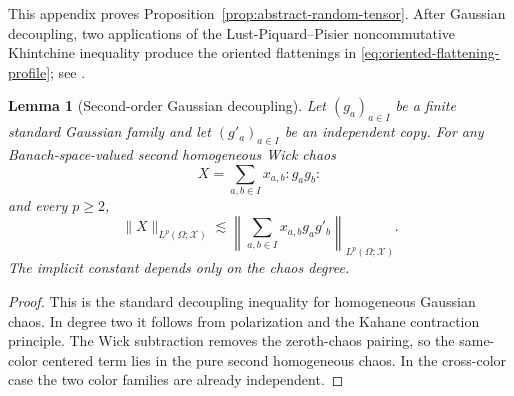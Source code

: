 \documentclass[10pt]{amsart}
\numberwithin{equation}{section}
\theoremstyle{plain}
\newtheorem{lemma}[theorem]{Lemma}
\theoremstyle{definition}
\theoremstyle{remark}
\begin{document}
This appendix proves Proposition~\ref{prop:abstract-random-tensor}.  After Gaussian decoupling, two applications of the Lust-Piquard--Pisier noncommutative Khintchine inequality produce the oriented flattenings in \eqref{eq:oriented-flattening-profile}; see \cite{DeLaPenaGine,LustPisier,DNY,Kaneshiro}.

\begin{lemma}[Second-order Gaussian decoupling]\label{lem:second-order-decoupling}
Let $(g_a)_{a\in I}$ be a finite standard Gaussian family and let $(g'_a)_{a\in I}$ be an independent copy.  For any Banach-space-valued second homogeneous Wick chaos
\[
        X=\sum_{a,b\in I}x_{a,b}:g_ag_b:
\]
and every $p\ge2$,
\begin{equation}\label{eq:second-order-decoupling}
        \|X\|_{L^p(\Omega;\mathcal X)}
        \lesssim
        \left\|\sum_{a,b\in I}x_{a,b}g_ag'_b\right\|_{L^p(\Omega;\mathcal X)}.
\end{equation}
The implicit constant depends only on the chaos degree.
\end{lemma}

\begin{proof}
This is the standard decoupling inequality for homogeneous Gaussian chaos.  In degree two it follows from polarization and the Kahane contraction principle.  The Wick subtraction removes the zeroth-chaos pairing, so the same-color centered term lies in the pure second homogeneous chaos.  In the cross-color case the two color families are already independent.
\end{proof}
\end{document}
